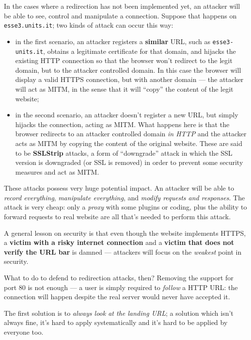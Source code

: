 \documentclass[10pt]{extreport}
\begin{document}
In the cases where a redirection has not been implemented yet, an attacker will
be able to see, control and manipulate a connection. Suppose that happens on
\texttt{esse3.\-units.it}; two kinds of attack can occur this way:
\begin{itemize}
    \item in the first scenario, an attacker registers a \textbf{similar} URL,
        such as \texttt{esse3\--units.it}, obtains a legitimate certificate for
        that domain, and hijacks the existing HTTP connection so that the
        browser won't redirect to the legit domain, but to the attacker
        controlled domain. In this case the browser will display a valid HTTPS
        connection, but with another domain --- the attacker will act as MITM,
        in the sense that it will ``copy'' the content of the legit website;
    \item in the second scenario, an attacker doesn't register a new URL, but
        simply hijacks the connection, acting as MITM. What happens here is
        that the browser redirects to an attacker controlled domain \emph{in
        HTTP} and the attacker acts as MITM by copying the content of the
        original website. These are said to be \textbf{SSLStrip} attacks, a form
        of ``downgrade'' attack in which the SSL version is downgraded (or SSL
        is removed) in order to prevent some security measures and act as MITM.
\end{itemize}

These attacks possess very huge potential impact. An attacker will be able to
\emph{record everything}, \emph{manipulate everything}, and \emph{modify
requests and responses}. The attack is very cheap: only a \emph{proxy} with
some plugins or coding, plus the ability to forward requests to real website
are all that's needed to perform this attack.

A general lesson on security is that even though the website implements HTTPS,
a \textbf{victim with a risky internet connection} and a \textbf{victim that
does not verify the URL bar} is damned --- attackers will focus on the
\emph{weakest} point in security.

What to do to defend to redirection attacks, then?
Removing the support for port $80$ is not enough --- a user is simply required
to \emph{follow} a HTTP URL: the connection will happen despite the real server
would never have accepted it. 

The first solution is to \emph{always look at the landing URL}; a solution
which isn't always fine, it's hard to apply systematically and it's hard to be
applied by everyone too.
\end{document}

